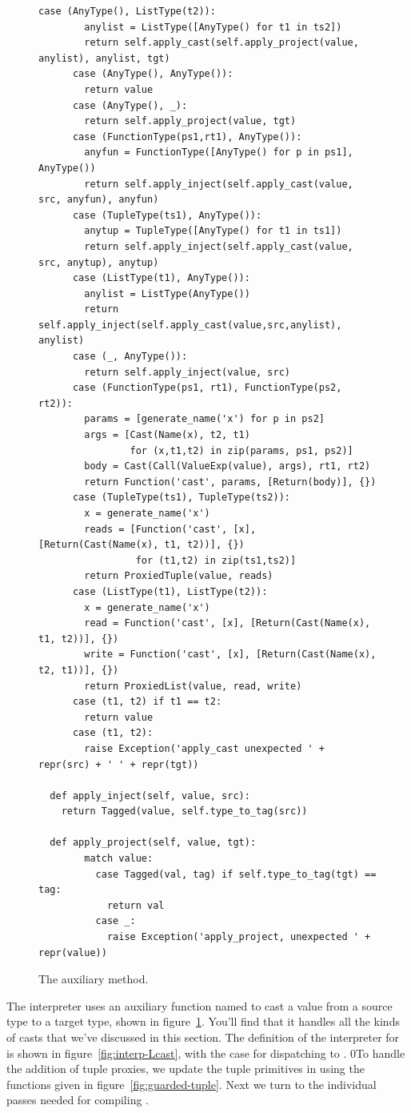 \documentclass[7x10]{TimesAPriori_MIT}%
\def\racketEd{0}
\providecommand{\BookEdition}{1}
\let\edition\BookEdition
\newcommand{\racket}[1]{{\if\edition\racketEd{#1}\fi}}
\numberwithin{theorem}{chapter}
\numberwithin{definition}{chapter}
\numberwithin{equation}{chapter}
\begin{document}
\begin{figure}[tbp]
\begin{tcolorbox}[colback=white]
{\begin{lstlisting}[basicstyle=\ttfamily\footnotesize]
      case (AnyType(), ListType(t2)):
        anylist = ListType([AnyType() for t1 in ts2])
        return self.apply_cast(self.apply_project(value, anylist), anylist, tgt)
      case (AnyType(), AnyType()):
        return value
      case (AnyType(), _):
        return self.apply_project(value, tgt)
      case (FunctionType(ps1,rt1), AnyType()):
        anyfun = FunctionType([AnyType() for p in ps1], AnyType())
        return self.apply_inject(self.apply_cast(value, src, anyfun), anyfun)
      case (TupleType(ts1), AnyType()):
        anytup = TupleType([AnyType() for t1 in ts1])
        return self.apply_inject(self.apply_cast(value, src, anytup), anytup)
      case (ListType(t1), AnyType()):
        anylist = ListType(AnyType())
        return self.apply_inject(self.apply_cast(value,src,anylist), anylist)
      case (_, AnyType()):
        return self.apply_inject(value, src)
      case (FunctionType(ps1, rt1), FunctionType(ps2, rt2)):
        params = [generate_name('x') for p in ps2]
        args = [Cast(Name(x), t2, t1)
                for (x,t1,t2) in zip(params, ps1, ps2)]
        body = Cast(Call(ValueExp(value), args), rt1, rt2)
        return Function('cast', params, [Return(body)], {})
      case (TupleType(ts1), TupleType(ts2)):
        x = generate_name('x')
        reads = [Function('cast', [x], [Return(Cast(Name(x), t1, t2))], {})
                 for (t1,t2) in zip(ts1,ts2)]
        return ProxiedTuple(value, reads)
      case (ListType(t1), ListType(t2)):
        x = generate_name('x')
        read = Function('cast', [x], [Return(Cast(Name(x), t1, t2))], {})
        write = Function('cast', [x], [Return(Cast(Name(x), t2, t1))], {})
        return ProxiedList(value, read, write)
      case (t1, t2) if t1 == t2:
        return value
      case (t1, t2):
        raise Exception('apply_cast unexpected ' + repr(src) + ' ' + repr(tgt))

  def apply_inject(self, value, src):
    return Tagged(value, self.type_to_tag(src))

  def apply_project(self, value, tgt):
        match value:
          case Tagged(val, tag) if self.type_to_tag(tgt) == tag:
            return val
          case _:
            raise Exception('apply_project, unexpected ' + repr(value))
\end{lstlisting}
\fi}
\end{tcolorbox}
\caption{The  auxiliary method.}
  \label{fig:apply_cast}
\end{figure}

The \LangCast{} interpreter uses an auxiliary function named
 to cast a value from a source type to a target type,
shown in figure~\ref{fig:apply_cast}. You'll find that it handles all
the kinds of casts that we've discussed in this section.
%
The definition of the interpreter for \LangCast{} is shown in
figure~\ref{fig:interp-Lcast}, with the case for 
dispatching to .
\racket{To handle the addition of tuple
proxies, we update the tuple primitives in \code{interp-op} using the
functions given in figure~\ref{fig:guarded-tuple}.}
Next we turn to the individual passes needed for compiling \LangGrad{}.
\end{document}
